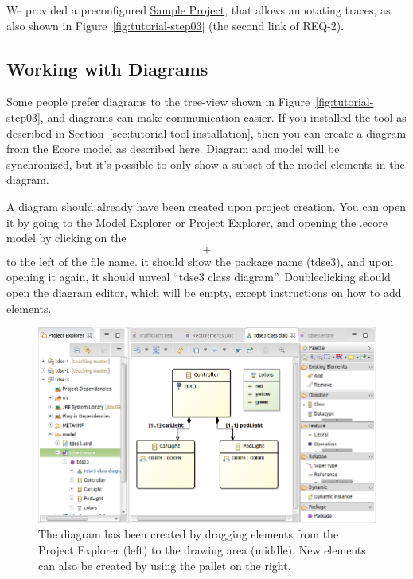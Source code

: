 We provided a preconfigured \href{../se-materials/tutorial/tdse-3/}{Sample Project}, that allows annotating traces, as also shown in Figure~\ref{fig:tutorial-step03} (the second link of REQ-2).

\subsection{Working with Diagrams}

Some people prefer diagrams to the tree-view shown in Figure~\ref{fig:tutorial-step03}, and diagrams can make communication easier.  If you installed the tool as described in Section~\ref{sec:tutorial-tool-installation}, then you can create a diagram from the Ecore model as described here.  Diagram and model will be synchronized, but it's possible to only show a subset of the model elements in the diagram.

A diagram should already have been created upon project creation.  You can open it by going to the Model Explorer or Project Explorer, and opening the .ecore model by clicking on the \[+\] to the left of the file name. it should show the package name (tdse3), and upon opening it again, it should unveal ``tdse3 class diagram''.  Doubleclicking should open the diagram editor, which will be empty, except instructions on how to add elements.

\begin{figure}[h!]
  \centering
  \includegraphics[width=\linewidth]{../se-images/ecore_diagram.png}
  \caption{The diagram has been created by dragging elements from the Project Explorer (left) to the drawing area (middle).  New elements can also be created by using the pallet on the right.}
  \label{fig:ecore_diagram}
\end{figure}

